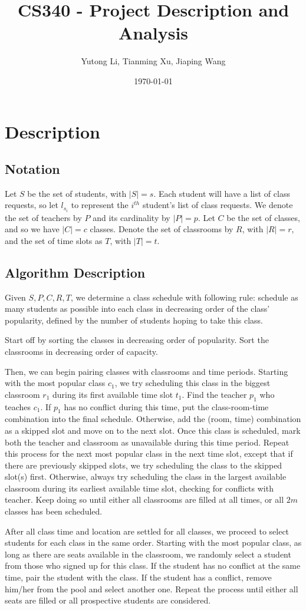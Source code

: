 \documentclass[11pt, oneside]{article}   	%
\title{CS340 - Project Description and Analysis}
\author{Yutong Li, Tianming Xu, Jiaping Wang}
\date{\today}							%
\begin{document}
\maketitle

\section{Description}
\subsection{Notation}
Let $S$ be the set of students, with $|S|=s$. Each student will have a list of class requests, so let $l_{s_i}$ to represent the $i^{th}$ student's list of class requests. We denote the set of teachers by $P$ and its cardinality by $|P|=p$. Let $C$ be the set of classes, and so we have $|C|=c$ classes. Denote the set of classrooms by $R$, with $|R|=r$, and the set of time slots as $T$, with $|T|=t$. 
\subsection{Algorithm Description}
Given $S, P, C, R, T$, we determine a class schedule with following rule: schedule as many students as possible into each class in decreasing order of the class' popularity, defined by the number of students hoping to take this class. \par 
Start off by sorting the classes in decreasing order of popularity. Sort the classrooms in decreasing order of capacity. \par
Then, we can begin pairing classes with classrooms and time periods. Starting with the most popular class $c_1$, we try scheduling this class in the biggest classroom $r_1$ during its first available time slot $t_1$. Find the teacher $p_1$ who teaches $c_1$. If $p_1$ has no conflict during this time, put the class-room-time combination into the final schedule. Otherwise, add the (room, time) combination as a skipped slot and move on to the next slot. Once this class is scheduled, mark both the teacher and classroom as unavailable during this time period. Repeat this process for the next most popular class in the next time slot, except that if there are previously skipped slots, we try scheduling the class to the skipped slot(s) first. Otherwise, always try scheduling the class in the largest available classroom during its earliest available time slot, checking for conflicts with teacher. Keep doing so until either all classrooms are filled at all times, or all $2m$ classes has been scheduled.\par
After all class time and location are settled for all classes, we proceed to select students for each class in the same order. Starting with the most popular class, as long as there are seats available in the classroom, we randomly select a student from those who signed up for this class. If the student has no conflict at the same time, pair the student with the class. If the student has a conflict, remove him/her from the pool and select another one. Repeat the process until either all seats are filled or all prospective students are considered.
\end{document}
